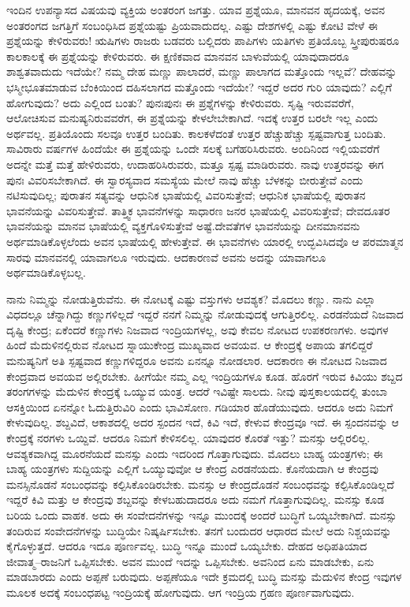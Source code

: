 ಇಂದಿನ ಉಪನ್ಯಾಸದ ವಿಷಯವು ವ್ಯಕ್ತಿಯ ಅಂತರಂಗ ಜಗತ್ತು. ಯಾವ ಪ್ರಶ್ನೆಯೂ, ಮಾನವನ ಹೃದಯಕ್ಕೆ, ಅವನ ಅಂತರಂಗದ ಜಗತ್ತಿಗೆ ಸಂಬಂಧಿಸಿದ ಪ್ರಶ್ನೆಯಷ್ಟು ಪ್ರಿಯವಾದುದಲ್ಲ. ಎಷ್ಟು ದೇಶಗಳಲ್ಲಿ ಎಷ್ಟು ಕೋಟಿ ವೇಳೆ ಈ ಪ್ರಶ್ನೆಯನ್ನು ಕೇಳಿರುವರು! ಋಷಿಗಳು ರಾಜರು ಬಡವರು ಬಲ್ಲಿದರು ಪಾಪಿಗಳು ಯತಿಗಳು ಪ್ರತಿಯೊಬ್ಬ ಸ್ತ್ರೀಪುರುಷರೂ ಕಾಲಕಾಲಕ್ಕೆ ಈ ಪ್ರಶ್ನೆಯನ್ನು ಕೇಳಿರುವರು. ಈ ಕ್ಷಣಿಕವಾದ ಮಾನವನ ಬಾಳುವೆಯಲ್ಲಿ ಯಾವುದಾದರೂ ಶಾಶ್ವತವಾದುದು ಇದೆಯೇ? ನಮ್ಮ ದೇಹ ಮಣ್ಣು ಪಾಲಾದರೆ, ಮಣ್ಣು ಪಾಲಾಗದ ಮತ್ತೊಂದು ಇಲ್ಲವೆ? ದೇಹವನ್ನು ಭಸ್ಮೀಭೂತಮಾಡುವ ಬೆಂಕಿಯಿಂದ ದಹಿಸಲಾಗದ ಮತ್ತೊಂದು ಇದೆಯೇ? ಇದ್ದರೆ ಅದರ ಗುರಿ ಯಾವುದು? ಎಲ್ಲಿಗೆ ಹೋಗುವುದು? ಅದು ಎಲ್ಲಿಂದ ಬಂತು? ಪುನಃಪುನಃ ಈ ಪ್ರಶ್ನೆಗಳನ್ನು ಕೇಳಿರುವರು. ಸೃಷ್ಟಿ ಇರುವವರೆಗೆ, ಆಲೋಚಿಸುವ ಮನುಷ್ಯನಿರುವವರೆಗ, ಈ ಪ್ರಶ್ನೆಯನ್ನು ಕೇಳಲೇಬೇಕಾಗಿದೆ. ಇದಕ್ಕೆ ಉತ್ತರ ಬರಲೇ ಇಲ್ಲ ಎಂದು ಅರ್ಥವಲ್ಲ. ಪ್ರತಿಯೊಂದು ಸಲವೂ ಉತ್ತರ ಬಂದಿತು. ಕಾಲಕಳೆದಂತೆ ಉತ್ತರ ಹೆಚ್ಚುಹೆಚ್ಚು ಸ್ಪಷ್ಟವಾಗುತ್ತ ಬಂದಿತು. ಸಾವಿರಾರು ವರ್ಷಗಳ ಹಿಂದೆಯೇ ಈ ಪ್ರಶ್ನೆಯನ್ನು ಒಂದೇ ಸಲಕ್ಕೆ ಬಗೆಹರಿಸಿರುವರು. ಅಂದಿನಿಂದ ಇಲ್ಲಿಯವರೆಗೆ ಅದನ್ನೇ ಮತ್ತೆ ಮತ್ತೆ ಹೇಳಿರುವರು, ಉದಾಹರಿಸಿರುವರು, ಮತ್ತೂ ಸ್ಪಷ್ಟ ಮಾಡಿರುವರು. ನಾವು ಉತ್ತರವನ್ನು ಈಗ ಪುನಃ ವಿವರಿಸಬೇಕಾಗಿದೆ. ಈ ಸ್ವಾರಸ್ಯವಾದ ಸಮಸ್ಯೆಯ ಮೇಲೆ ನಾವು ಹೆಚ್ಚು ಬೆಳಕನ್ನು ಬೀರುತ್ತೇವೆ ಎಂದು ನಟಿಸುವುದಿಲ್ಲ; ಪುರಾತನ ಸತ್ಯವನ್ನು ಆಧುನಿಕ ಭಾಷೆಯಲ್ಲಿ ವಿವರಿಸುತ್ತೇವೆ; ಆಧುನಿಕ ಭಾಷೆಯಲ್ಲಿ ಪುರಾತನ ಭಾವನೆಯನ್ನು ವಿವರಿಸುತ್ತೇವೆ. ತಾತ್ತ್ವಿಕ ಭಾವನೆಗಳನ್ನು ಸಾಧಾರಣ ಜನರ ಭಾಷೆಯಲ್ಲಿ ವಿವರಿಸುತ್ತೇವೆ; ದೇವದೂತರ ಭಾವನೆಯನ್ನು ಮಾನವ ಭಾಷೆಯಲ್ಲಿ ವ್ಯಕ್ತಗೊಳಿಸುತ್ತೇವೆ ಅಷ್ಟೆ.ದೇವತೆಗಳ ಭಾವನೆಯನ್ನು ದೀನಮಾನವನು ಅರ್ಥಮಾಡಿಕೊಳ್ಳಲೆಂದು ಅವನ ಭಾಷೆಯಲ್ಲಿ ಹೇಳುತ್ತೇವೆ. ಈ ಭಾವನೆಗಳು ಯಾರಲ್ಲಿ ಉದ್ಭವಿಸಿದವೊ ಆ ಪರಮಾತ್ಮನ ಸಾರವು ಮಾನವನಲ್ಲಿ ಯಾವಾಗಲೂ ಇರುವುದು. ಆದಕಾರಣವೆ ಅವನು ಅದನ್ನು ಯಾವಾಗಲೂ ಅರ್ಥಮಾಡಿಕೊಳ್ಳಬಲ್ಲ.

ನಾನು ನಿಮ್ಮನ್ನು ನೋಡುತ್ತಿರುವೆನು. ಈ ನೋಟಕ್ಕೆ ಎಷ್ಟು ವಸ್ತುಗಳು ಆವಶ್ಯಕ? ಮೊದಲು ಕಣ್ಣು. ನಾನು ಎಲ್ಲಾ ವಿಧದಲ್ಲೂ ಚೆನ್ನಾಗಿದ್ದು ಕಣ್ಣುಗಳಿಲ್ಲದೆ ಇದ್ದರೆ ನನಗೆ ನಿಮ್ಮನ್ನು ನೋಡುವುದಕ್ಕೆ ಆಗುತ್ತಿರಲಿಲ್ಲ. ಎರಡನೆಯದೆ ನಿಜವಾದ ದೃಷ್ಟಿ ಕೇಂದ್ರ; ಏಕೆಂದರೆ ಕಣ್ಣುಗಳು ನಿಜವಾದ ಇಂದ್ರಿಯಗಳಲ್ಲ, ಅವು ಕೇವಲ ನೋಟದ ಉಪಕರಣಗಳು. ಅವುಗಳ ಹಿಂದೆ ಮೆದುಳಿನಲ್ಲಿರುವ ನೋಟದ ಸ್ನಾಯುಕೇಂದ್ರ ಮುಖ್ಯವಾದ ಅವಯವ. ಆ ಕೇಂದ್ರಕ್ಕೆ ಅಪಾಯ ತಗಲಿದ್ದರೆ ಮನುಷ್ಯನಿಗೆ ಅತಿ ಸ್ಪಷ್ಟವಾದ ಕಣ್ಣುಗಳಿದ್ದರೂ ಅವನು ಏನನ್ನೂ ನೋಡಲಾರ. ಆದಕಾರಣ ಈ ನೋಟದ ನಿಜವಾದ ಕೇಂದ್ರವಾದ ಅವಯವ ಅಲ್ಲಿರಬೇಕು. ಹೀಗೆಯೇ ನಮ್ಮ ಎಲ್ಲ ಇಂದ್ರಿಯಗಳೂ ಕೂಡ. ಹೊರಗೆ ಇರುವ ಕಿವಿಯು ಶಬ್ದದ ತರಂಗಗಳನ್ನು ಮೆದುಳಿನ ಕೇಂದ್ರಕ್ಕೆ ಒಯ್ಯುವ ಯಂತ್ರ. ಆದರೆ ಇವಿಷ್ಟೇ ಸಾಲದು. ನೀವು ಪುಸ್ತಕಾಲಯದಲ್ಲಿ ತುಂಬಾ ಆಸಕ್ತಿಯಿಂದ ಏನನ್ನೋ ಓದುತ್ತಿರುವಿರಿ ಎಂದು ಭಾವಿಸೋಣ. ಗಡಿಯಾರ ಹೊಡೆಯುವುದು. ಆದರೂ ಅದು ನಿಮಗೆ ಕೇಳುವುದಿಲ್ಲ. ಶಬ್ದವಿದೆ, ಆಕಾಶದಲ್ಲಿ ಅದರ ಸ್ಪಂದನ ಇದೆ, ಕಿವಿ ಇದೆ, ಕೇಳುವ ಕೇಂದ್ರವೂ ಇದೆ. ಈ ಸ್ಪಂದನವನ್ನು ಆ ಕೇಂದ್ರಕ್ಕೆ ನರಗಳು ಒಯ್ದಿವೆ. ಆದರೂ ನಿಮಗೆ ಕೇಳಿಸಲಿಲ್ಲ. ಯಾವುದರ ಕೊರತೆ ಇತ್ತು? ಮನಸ್ಸು ಆಲ್ಲಿರಲಿಲ್ಲ. ಆವಶ್ಯಕವಾಗಿದ್ದ ಮೂರನೆಯದೆ ಮನಸ್ಸು ಎಂದು ಇದರಿಂದ ಗೊತ್ತಾಗುವುದು. ಮೊದಲು ಬಾಹ್ಯ ಯಂತ್ರಗಳು; ಈ ಬಾಹ್ಯ ಯಂತ್ರಗಳು ಸುದ್ದಿಯನ್ನು ಎಲ್ಲಿಗೆ ಒಯ್ಯುವುವೋ ಆ ಕೇಂದ್ರ ಎರಡನೆಯದು. ಕೊನೆಯದಾಗಿ ಆ ಕೇಂದ್ರವು ಮನಸ್ಸಿನೊಡನೆ ಸಂಬಂಧವನ್ನು ಕಲ್ಪಿಸಿಕೊಂಡಿರಬೇಕು. ಮನಸ್ಸು ಆ ಕೇಂದ್ರದೊಡನೆ ಸಂಬಂಧವನ್ನು ಕಲ್ಪಿಸಿಕೊಂಡಿಲ್ಲದೆ ಇದ್ದರೆ ಕಿವಿ ಮತ್ತು ಆ ಕೇಂದ್ರವು ಶಬ್ದವನ್ನು ಕೇಳಬಹುದಾದರೂ ಅದು ನಮಗೆ ಗೊತ್ತಾಗುವುದಿಲ್ಲ. ಮನಸ್ಸು ಕೂಡ ಬರಿಯ ಒಂದು ವಾಹಕ. ಅದು ಈ ಸಂವೇದನೆಗಳನ್ನು ಇನ್ನೂ ಮುಂದಕ್ಕೆ ಅಂದರೆ ಬುದ್ಧಿಗೆ ಒಯ್ಯಬೇಕಾಗಿದೆ. ಮನಸ್ಸು ತಂದಿರುವ ಸಂವೇದನೆಗಳನ್ನು ಬುದ್ಧಿಯೇ ನಿಷ್ಕರ್ಷಿಸಬೇಕು. ತನಗೆ ಬಂದುದರ ಆಧಾರದ ಮೇಲೆ ಅದು ನಿಶ್ಚಯವನ್ನು ಕೈಗೊಳ್ಳುತ್ತದೆ. ಆದರೂ ಇದೂ ಪೂರ್ಣವಲ್ಲ. ಬುದ್ಧಿ ಇನ್ನೂ ಮುಂದೆ ಒಯ್ಯಬೇಕು. ದೇಹದ ಅಧಿಪತಿಯಾದ ಜೀವಾತ್ಮ–ರಾಜನಿಗೆ ಒಪ್ಪಿಸಬೇಕು. ಅವನ ಮುಂದೆ ಇದನ್ನು ಒಪ್ಪಿಸಬೇಕು. ಅವನಿಂದ ಏನು ಮಾಡಬೇಕು, ಏನು ಮಾಡಬಾರದು ಎಂದು ಅಪ್ಪಣೆ ಬರುವುದು. ಅಪ್ಪಣೆಯೂ ಇದೇ ಕ್ರಮದಲ್ಲಿ ಬುದ್ಧಿ ಮನಸ್ಸು ಮೆದುಳಿನ ಕೇಂದ್ರ ಇವುಗಳ ಮೂಲಕ ಅದಕ್ಕೆ ಸಂಬಂಧಪಟ್ಟ ಇಂದ್ರಿಯಕ್ಕೆ ಹೋಗುವುದು. ಆಗ ಇಂದ್ರಿಯ ಗ್ರಹಣ ಪೂರ್ಣವಾಗುವುದು.

